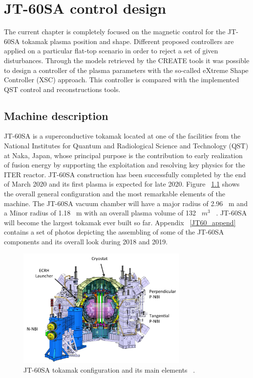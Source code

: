 \chapter{JT-60SA control design}

The current chapter is completely  focused on the magnetic control for  the JT-60SA tokamak  plasma position and shape. Different proposed  controllers  are applied  on a particular flat-top scenario in order to reject a set of given disturbances. Through the models retrieved by the CREATE tools it was possible to design a controller of the plasma parameters with the so-called eXtreme Shape Controller (XSC) approach. This controller is compared with the implemented QST control and reconstructions tools.   

\section{Machine description}

JT-60SA is a superconductive tokamak located at one of the facilities from the National Institutes for Quantum and Radiological Science and Technology (QST)  at  Naka, Japan, whose principal purpose is  the contribution to early realization of fusion energy by supporting the exploitation and resolving key physics for the ITER reactor.  JT-60SA construction has been successfully completed by the end of March 2020 and its first plasma is expected for late 2020. Figure ~\ref{JT60schm} shows the overall general configuration and the most remarkable elements of the machine. The JT-60SA  vacuum chamber will have a major radius of 2.96~ m and a Minor radius of 1.18~ m with an overall plasma volume of 132~ $m^3$ ~\cite{Spears2014}. JT-60SA will become the largest tokamak ever built so far. Appendix ~\ref{JT60_append} contains a set of photos depicting the assembling of some of the JT-60SA components and its overall look during 2018 and 2019. 
\smallskip

\begin{figure}[h]
	\centering
	\includegraphics[width=0.75\textwidth]{Chp3/JT60SA.png}
	
	\caption{\label{JT60schm}JT-60SA tokamak configuration and its main elements ~\cite{JT60SA:ResearchPlan}.}
\end{figure}

